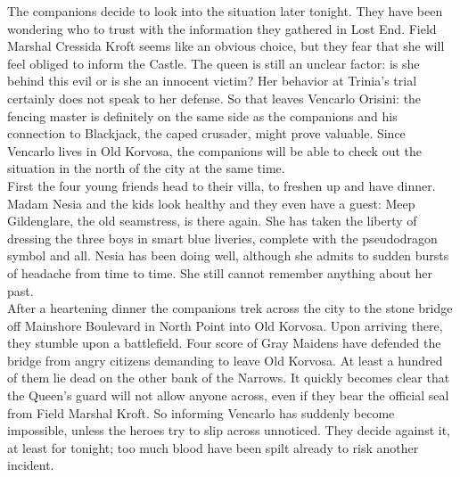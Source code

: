 The companions decide to look into the situation later tonight. They have been wondering who to trust with the information they gathered in Lost End. Field Marshal Cressida Kroft seems like an obvious choice, but they fear that she will feel obliged to inform the Castle. The queen is still an unclear factor: is she behind this evil or is she an innocent victim? Her behavior at Trinia's trial certainly does not speak to her defense. So that leaves Vencarlo Orisini: the fencing master is definitely on the same side as the companions and his connection to Blackjack, the caped crusader, might prove valuable. Since Vencarlo lives in Old Korvosa, the companions will be able to check out the situation in the north of the city at the same time.\\

First the four young friends head to their villa, to freshen up and have dinner. Madam Nesia and the kids look healthy and they even have a guest: Meep Gildenglare, the old seamstress, is there again. She has taken the liberty of dressing the three boys in smart blue liveries, complete with the pseudodragon symbol and all. Nesia has been doing well, although she admits to sudden bursts of headache from time to time. She still cannot remember anything about her past.\\

After a heartening dinner the companions trek across the city to the stone bridge off Mainshore Boulevard in North Point into Old Korvosa. Upon arriving there, they stumble upon a battlefield. Four score of Gray Maidens have defended the bridge from angry citizens demanding to leave Old Korvosa. At least a hundred of them lie dead on the other bank of the Narrows. It quickly becomes clear that the Queen's guard will not allow anyone across, even if they bear the official seal from Field Marshal Kroft. So informing Vencarlo has suddenly become impossible, unless the heroes try to slip across unnoticed. They decide against it, at least for tonight; too much blood have been spilt already to risk another incident.\\

